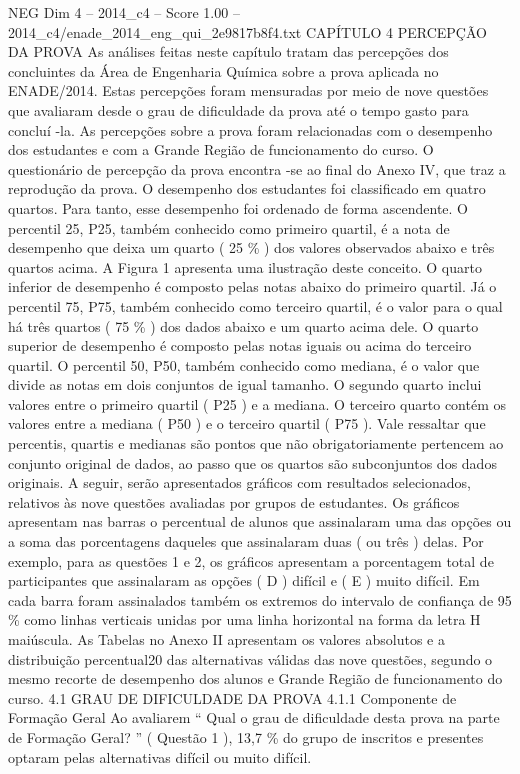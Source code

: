 \begin{textsample}{NEG Dim 4 – 2014\_c4 – Score 1.00 – 2014\_c4/enade\_2014\_eng\_qui\_2e9817b8f4.txt}  \label{ex:f4_neg_151}
CAPÍTULO 4 PERCEPÇÃO DA PROVA As análises feitas neste capítulo tratam das percepções dos concluintes da Área de Engenharia Química sobre a prova aplicada no ENADE/2014.
Estas percepções foram mensuradas por meio de nove questões que avaliaram desde o grau de dificuldade da prova até o tempo gasto para concluí -la.
As percepções sobre a prova foram relacionadas com o desempenho dos estudantes e com a Grande Região de funcionamento do curso.
O questionário de percepção da prova encontra -se ao final do Anexo IV, que traz a reprodução da prova.
O desempenho dos estudantes foi classificado em quatro quartos.
Para tanto, esse desempenho foi ordenado de forma ascendente.
O percentil 25, P25, também conhecido como primeiro quartil, é a nota de desempenho que deixa um quarto ( 25 \% ) dos valores observados abaixo e três quartos acima.
A Figura 1 apresenta uma ilustração deste conceito.
O quarto inferior de desempenho é composto pelas notas abaixo do primeiro quartil.
Já o percentil 75, P75, também conhecido como terceiro quartil, é o valor para o qual há três quartos ( 75 \% ) dos dados abaixo e um quarto acima dele.
O quarto superior de desempenho é composto pelas notas iguais ou acima do terceiro quartil.
O percentil 50, P50, também conhecido como mediana, é o valor que divide as notas em dois conjuntos de igual tamanho.
O segundo quarto inclui valores entre o primeiro quartil ( P25 ) e a mediana.
O terceiro quarto contém os valores entre a mediana ( P50 ) e o terceiro quartil ( P75 ).
Vale ressaltar que percentis, quartis e medianas são pontos que não obrigatoriamente pertencem ao conjunto original de dados, ao passo que os quartos são subconjuntos dos dados originais.
A seguir, serão apresentados gráficos com resultados selecionados, relativos às nove questões avaliadas por grupos de estudantes.
Os gráficos apresentam nas barras o percentual de alunos que assinalaram uma das opções ou a soma das porcentagens daqueles que assinalaram duas ( ou três ) delas.
Por exemplo, para as questões 1 e 2, os gráficos apresentam a porcentagem total de participantes que assinalaram as opções ( D ) difícil e ( E ) muito difícil.
Em cada barra foram assinalados também os extremos do intervalo de confiança de 95 \% como linhas verticais unidas por uma linha horizontal na forma da letra H maiúscula.
As Tabelas no Anexo II apresentam os valores absolutos e a distribuição percentual20 das alternativas válidas das nove questões, segundo o mesmo recorte de desempenho dos alunos e Grande Região de funcionamento do curso. 4.1 GRAU DE DIFICULDADE DA PROVA 4.1.1 Componente de Formação Geral Ao avaliarem “ Qual o grau de dificuldade desta prova na parte de Formação Geral? ” ( Questão 1 ), 13,7 \% do grupo de inscritos e presentes optaram pelas alternativas difícil ou muito difícil.

\end{textsample}
